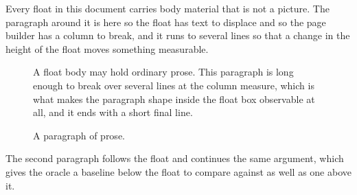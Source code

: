 \documentclass{article}
\begin{document}
Every float in this document carries body material that is not a
picture. The paragraph around it is here so the float has text to displace and
so the page builder has a column to break, and it runs to several lines so that
a change in the height of the float moves something measurable.

\begin{figure}[h]
A float body may hold ordinary prose. This paragraph is long enough to
break over several lines at the column measure, which is what makes the
paragraph shape inside the float box observable at all, and it ends with a
short final line.
\caption{A paragraph of prose.}
\end{figure}

The second paragraph follows the float and continues the same
argument, which gives the oracle a baseline below the float to compare against
as well as one above it.
\end{document}
